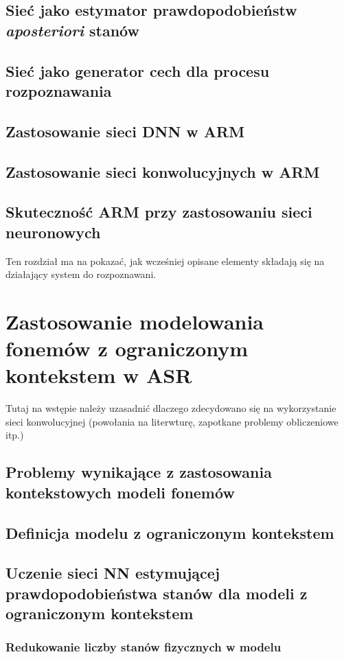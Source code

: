 \documentclass[11pt]{article}
\begin{document}
	\subsection{Sieć jako estymator prawdopodobieństw \textit{aposteriori} stanów }
	\subsection{Sieć jako generator cech dla procesu rozpoznawania }
	\subsection{Zastosowanie sieci DNN w ARM}
	\subsection{Zastosowanie sieci konwolucyjnych w ARM}
	\subsection{Skuteczność ARM przy zastosowaniu sieci neuronowych}
	
	Ten rozdział ma na pokazać, jak wcześniej opisane elementy składają się na działający system do rozpoznawani.

\section{ Zastosowanie modelowania fonemów z ograniczonym kontekstem w ASR }	
    Tutaj na wstępie należy uzasadnić dlaczego zdecydowano się na wykorzystanie sieci konwolucyjnej (powołania na literwturę, zapotkane problemy obliczeniowe itp.)
	\subsection{ Problemy wynikające z zastosowania kontekstowych modeli fonemów }
	\subsection{ Definicja modelu z ograniczonym kontekstem }
	\subsection{ Uczenie sieci NN estymującej prawdopodobieństwa stanów dla modeli z ograniczonym kontekstem }
		\subsubsection{ Redukowanie liczby stanów fizycznych w modelu }
\end{document}
